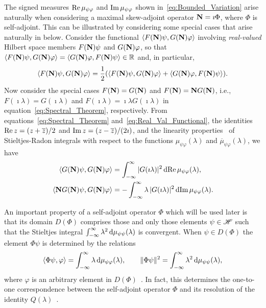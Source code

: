 \documentclass[amsa]{ipart}
\begin{document}
The signed measures $\mbox{Re}\,\mu_{\psi\varphi}$ and $\mbox{Im}\,\mu_{\psi\varphi}$ shown
in~\eqref{eq:Bounded_Variation} arise naturally when considering 
a maximal skew-adjoint operator $\mathbf{N}=\imath\Phi$, where $\Phi$ is
self-adjoint. This can be illustrated by considering some special
cases that arise naturally in
 below. Consider the
functional $\langle F(\mathbf{N})\psi,G(\mathbf{N})\varphi\rangle$ involving 
\emph{real-valued} Hilbert space members $F(\mathbf{N})\psi$ and $G(\mathbf{N})\varphi$, so
that $\langle F(\mathbf{N})\psi,G(\mathbf{N})\varphi\rangle=\langle G(\mathbf{N})\varphi,F(\mathbf{N})\psi\rangle\in\mathbb{R}$ and, in
particular, 
%
\begin{align}\label{eq:Real_Val_Functional}
  \langle F(\Nb)\psi,G(\Nb)\varphi\rangle=\frac{1}{2}(\langle F(\Nb)\psi,G(\Nb)\varphi\rangle+\langle G(\Nb)\varphi,F(\Nb)\psi\rangle).
\end{align}
%
Now consider the special cases $F(\mathbf{N})=G(\mathbf{N})$ and $F(\mathbf{N})=\mathbf{N} G(\mathbf{N})$,
i.e., $F(\imath\lambda)=G(\imath\lambda)$ and $F(\imath\lambda)=\imath\lambda G(\imath\lambda)$ in
equation~\eqref{eq:Spectral_Theorem}, respectively. 
From equations~\eqref{eq:Spectral_Theorem}
and~\eqref{eq:Real_Val_Functional}, the identities
$\mbox{Re}\, z=(z+\overline{z})/2$ and $\mbox{Im}\, z=(z-\overline{z})/(2\imath)$, and
the linearity properties~\cite{Stone:64} of Stieltjes-Radon integrals
with respect to the functions $\mu_{\psi\varphi}(\lambda)$ and $\overline{\mu}_{\psi\varphi}(\lambda)$,
we have
%
\begin{align}\label{eq:Real_Imag_mu_Reps}
  \langle G(\Nb)\psi,G(\Nb)\varphi\rangle&=\int_{-\infty}^\infty|G(\imath\lambda)|^2\,\d\Real\mu_{\psi\varphi}(\lambda),
  \\
   \langle\Nb G(\Nb)\psi,G(\Nb)\varphi\rangle&=-\int_{-\infty}^\infty\lambda\,|G(\imath\lambda)|^2\,\d\Imag\mu_{\psi\varphi}(\lambda).
   \notag
\end{align}
%




An important property of a self-adjoint operator $\Phi$ which will be
used later is that its domain $D(\Phi)$ comprises those and only those
elements $\psi\in\mathscr{H}$ such that the Stieltjes integral
$\int_{-\infty}^\infty\lambda^2\,\mathrm{d}\mu_{\psi\psi}(\lambda)$ is convergent. When $\psi\in D(\Phi)$ the element
$\Phi\psi$ is determined by the relations~\cite{Stone:64}      
%
\begin{align}\label{eq:X_Q_Correspondence}
  \langle\Phi\psi,\varphi\rangle=\int_{-\infty}^\infty\lambda\,\d\mu_{\psi\varphi}(\lambda), \qquad
  \|\Phi\psi\|^2=\int_{-\infty}^\infty\lambda^2\,\d\mu_{\psi\psi}(\lambda),
\end{align}
%
where $\varphi$ is an arbitrary element in $D(\Phi)$~\cite{Stone:64}. In fact,
this determines the one-to-one correspondence between the
self-adjoint operator $\Phi$ and its resolution of the identity
$Q(\lambda)$~\cite{Stone:64}. 
\end{document}
